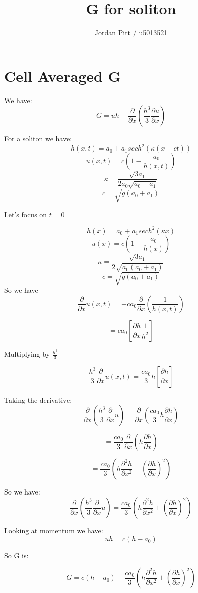 \documentclass[12pt]{article}
\begin{document}
\title{G for soliton}
\author{Jordan Pitt / u5013521}

\section{Cell Averaged G}
We have:
\[G = uh - \frac{\partial}{\partial x} \left(\frac{h^3}{3} \frac{\partial u}{\partial x}\right)\]

For a soliton we have:
\[h(x,t) = a_0 + a_1 sech^2\left(\kappa \left(x -ct\right)\right)\]
\[u(x,t) = c \left(1 - \frac{a_0}{h(x,t)}\right)\]
\[\kappa = \frac{\sqrt{3a_1}}{2a_0 \sqrt{a_0 + a_1}}\]
\[ c = \sqrt{g(a_0 + a_1)}\]

Let's focus on $t = 0$

\[h(x) = a_0 + a_1 sech^2\left(\kappa x\right)\]
\[u(x) = c \left(1 - \frac{a_0}{h(x)}\right)\]
\[\kappa = \frac{\sqrt{3a_1}}{2 \sqrt{a_0 \left(a_0 + a_1\right)}}\]
\[ c = \sqrt{g(a_0 + a_1)}\]
So we have
\[ \frac{\partial}{\partial x }u(x,t) =  - ca_0 \frac{\partial}{\partial x } \left(\frac{1}{h(x,t)}\right)\]

\[ = ca_0 \left[\frac{\partial h}{\partial x}\frac{1}{h^2}\right]\]

Multiplying by $\frac{h^3}{3}$

\[\frac{h^3}{3} \frac{\partial}{\partial x }u(x,t) = \frac{ca_0}{3}h  \left[\frac{\partial h}{\partial x}\right]\]

Taking the derivative:
\[\frac{\partial}{\partial x} \left(\frac{h^3}{3} \frac{\partial}{\partial x }u \right) =\frac{\partial}{\partial x} \left(\frac{ca_0}{3}h \frac{\partial h}{\partial x} \right)\]

\[= \frac{ca_0}{3} \frac{\partial}{\partial x} \left(h \frac{\partial h}{\partial x} \right)\]

\[= \frac{ca_0}{3} \left(h \frac{\partial^2 h}{\partial x^2} + \left(\frac{\partial h}{\partial x}\right)^2  \right)\]

So we have:
\[\frac{\partial}{\partial x} \left(\frac{h^3}{3} \frac{\partial}{\partial x }u \right) = \frac{ca_0}{3} \left(h \frac{\partial^2 h}{\partial x^2} + \left(\frac{\partial h}{\partial x}\right)^2  \right) \]

Looking at momentum we have:
\[uh = c \left(h - a_0\right) \]

So G is:

\[G =  c \left(h - a_0\right) - \frac{ca_0}{3} \left(h \frac{\partial^2 h}{\partial x^2} + \left(\frac{\partial h}{\partial x}\right)^2  \right)  \]
\end{document}

